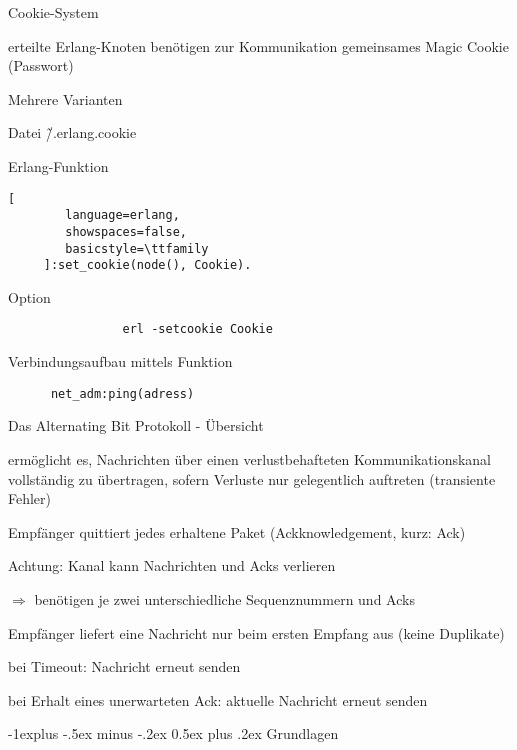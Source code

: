 \documentclass[10pt]{article}
\makeatletter
\renewcommand{\subsection}{\@startsection{subsection}{2}{0mm}%
                                {-1explus -.5ex minus -.2ex}%
                                {0.5ex plus .2ex}%
                                {\normalfont\normalsize\bfseries}}
\makeatother
\begin{document}
Cookie-System
\begin{itemize*}
  \item erteilte Erlang-Knoten benötigen zur Kommunikation gemeinsames Magic Cookie (Passwort)
  \item Mehrere Varianten
  \begin{itemize*}
    \item Datei \~/.erlang.cookie
    \item Erlang-Funktion
    \begin{lstlisting}[
        language=erlang,
        showspaces=false,
        basicstyle=\ttfamily
     ]:set_cookie(node(), Cookie).
    \end{lstlisting}
    \item Option
    \begin{lstlisting}
                erl -setcookie Cookie
              \end{lstlisting}
  \end{itemize*}
  \item Verbindungsaufbau mittels Funktion
  \begin{lstlisting}
      net_adm:ping(adress)
    \end{lstlisting}
\end{itemize*}

Das Alternating Bit Protokoll - Übersicht
\begin{itemize*}
  \item ermöglicht es, Nachrichten über einen verlustbehafteten Kommunikationskanal vollständig zu übertragen, sofern Verluste nur gelegentlich auftreten (transiente Fehler)
  \item Empfänger quittiert jedes erhaltene Paket (Ackknowledgement, kurz: Ack)
  \item Achtung: Kanal kann Nachrichten und Acks verlieren
  \begin{itemize*}
    \item $\Rightarrow$ benötigen je zwei unterschiedliche Sequenznummern und Acks
  \end{itemize*}
  \item Empfänger liefert eine Nachricht nur beim ersten Empfang aus (keine Duplikate)
  \item bei Timeout: Nachricht erneut senden
  \item bei Erhalt eines unerwarteten Ack: aktuelle Nachricht erneut senden
\end{itemize*}

\subsection{Grundlagen}
\end{document}
